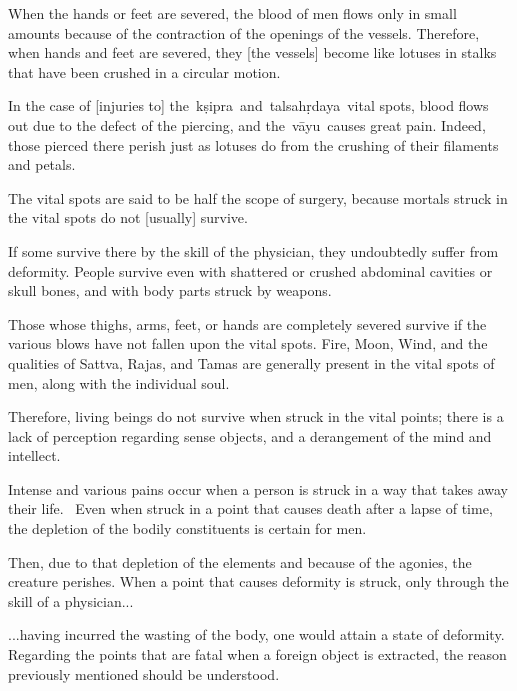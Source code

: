 \begin{translation}
\begin{tt}
\item[31]
When the hands or feet are severed, the blood of men flows only in small amounts because of the contraction of the openings of the vessels. Therefore, when hands and feet are severed, they [the vessels] become like lotuses in stalks that have been crushed in a circular motion.

\item[32]
In the case of [injuries to] the kṣipra and talsahṛdaya vital spots, blood flows out due to the defect of the piercing, and the vāyu causes great pain. Indeed, those pierced there perish just as lotuses do from the crushing of their filaments and petals. 


\item[33]
The vital spots are said to be half the scope of surgery, because mortals struck in the vital spots do not [usually] survive. 

\item[34]
If some survive there by the skill of the physician, they undoubtedly suffer from deformity.
People survive even with shattered or crushed abdominal cavities or skull bones, and with body parts struck by weapons.


\item[35]
Those whose thighs, arms, feet, or hands are completely severed survive if the various blows have not fallen upon the vital spots.
Fire, Moon, Wind, and the qualities of Sattva, Rajas, and Tamas are generally present in the vital spots of men, along with the individual soul.

\item[36]
Therefore, living beings do not survive when struck in the vital points; there is a lack of perception regarding sense objects, and a derangement of the mind and intellect. 


\item[37]
Intense and various pains occur when a person is struck in a way that takes away their life. 
Even when struck in a point that causes death after a lapse of time, the depletion of the bodily constituents is certain for men. 

\item[38]
Then, due to that depletion of the elements and because of the agonies, the creature perishes. When a point that causes deformity is struck, only through the skill of a physician...

\item[39]
...having incurred the wasting of the body, one would attain a state of deformity. Regarding the points that are fatal when a foreign object is extracted, the reason previously mentioned should be understood.


\end{tt}
\end{translation}

